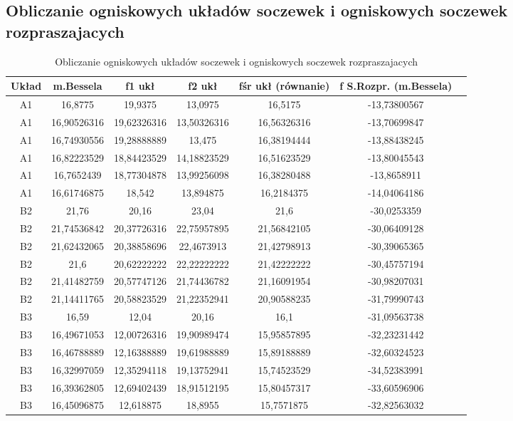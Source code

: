 \documentclass[polish,a4paper]{article}
\begin{document}
\subsection{Obliczanie ogniskowych układów soczewek i ogniskowych soczewek rozpraszajacych}
\begin{table}[H]
\centering
\begin{tabular}{|c|c|c|c|c|c|c|}
\hline
Układ &  m.Bessela &  f1 ukł &  f2 ukł &  fśr ukł (równanie) &  f S.Rozpr. (m.Bessela) \\
\hline
A1 &  16,8775 &  19,9375 &  13,0975 &  16,5175 &  -13,73800567 \\
A1 &  16,90526316 &  19,62326316 &  13,50326316 &  16,56326316 &  -13,70699847 \\
A1 &  16,74930556 &  19,28888889 &  13,475 &  16,38194444 &  -13,88438245 \\
A1 &  16,82223529 &  18,84423529 &  14,18823529 &  16,51623529 &  -13,80045543 \\
A1 &  16,7652439 &  18,77304878 &  13,99256098 &  16,38280488 &  -13,8658911 \\
A1 &  16,61746875 &  18,542 &  13,894875 &  16,2184375 &  -14,04064186 \\
\hline
B2 &  21,76 &  20,16 &  23,04 &  21,6 &  -30,0253359 \\
B2 &  21,74536842 &  20,37726316 &  22,75957895 &  21,56842105 &  -30,06409128 \\
B2 &  21,62432065 &  20,38858696 &  22,4673913 &  21,42798913 &  -30,39065365 \\
B2 &  21,6 &  20,62222222 &  22,22222222 &  21,42222222 &  -30,45757194 \\
B2 &  21,41482759 &  20,57747126 &  21,74436782 &  21,16091954 &  -30,98207031 \\
B2 &  21,14411765 &  20,58823529 &  21,22352941 &  20,90588235 &  -31,79990743 \\
\hline
B3 &  16,59 &  12,04 &  20,16 &  16,1 &  -31,09563738 \\
B3 &  16,49671053 &  12,00726316 &  19,90989474 &  15,95857895 &  -32,23231442 \\
B3 &  16,46788889 &  12,16388889 &  19,61988889 &  15,89188889 &  -32,60324523 \\
B3 &  16,32997059 &  12,35294118 &  19,13752941 &  15,74523529 &  -34,52383991 \\
B3 &  16,39362805 &  12,69402439 &  18,91512195 &  15,80457317 &  -33,60596906 \\
B3 &  16,45096875 &  12,618875 &  18,8955 &  15,7571875 &  -32,82563032 \\
\hline
\end{tabular}
\caption{Obliczanie ogniskowych układów soczewek i ogniskowych soczewek rozpraszajacych}
\end{table}
\end{document}
